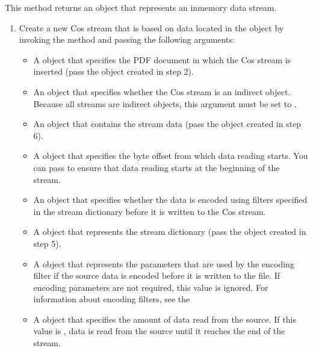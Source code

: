 \documentclass[letterpaper,12pt,english,openany,oneside]{sphinxmanual}
\begin{document}
This method returns an  object that represents an in\sphinxhyphen{}memory data stream.
\begin{enumerate}
%
\item {} 
Create a new Cos stream that is based on data located in the  object by invoking the  method and passing the following arguments:
\begin{itemize}
\item {} 
A  object that specifies the PDF document in which the Cos stream is inserted (pass the  object created in step 2).

\item {} 
An  object that specifies whether the Cos stream is an indirect object. Because all streams are indirect objects, this argument must be set to .

\item {} 
An  object that contains the stream data (pass the  object created in step 6).

\item {} 
A  object that specifies the byte offset from which data reading starts. You can pass  to ensure that data reading starts at the beginning of the stream.

\item {} 
An  object that specifies whether the data is encoded using filters specified in the stream dictionary before it is written to the Cos stream.

\item {} 
A  object that represents the stream dictionary (pass the  object created in step 5).

\item {} 
A  object that represents the parameters that are used by the encoding filter if the source data is encoded before it is written to the file. If encoding parameters are not required, this value is ignored. For information about encoding filters, see the 

\item {} 
A  object that specifies the amount of data read from the source. If this value is , data is read from the source until it reaches the end of the stream.

\end{itemize}

\end{enumerate}
\end{document}
